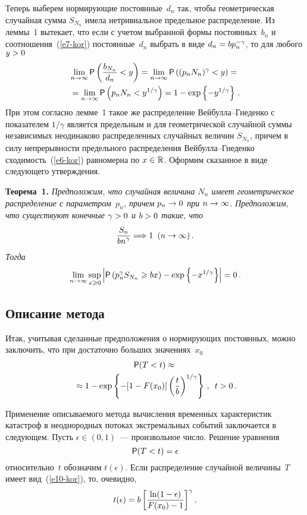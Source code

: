 \begin{multicols}{2}
Теперь выберем нормирующие постоянные~$d_n$ так, чтобы
геометрическая случайная сумма $S_{N_n}$ имела нетривиальное
предельное распределение. Из леммы~1 вытекает, что если с учетом
выбранной формы постоянных~$b_n$ и соотношения~(\ref{e7-kor}) постоянные~$d_n$
выбрать в виде $d_n\hm=bp_n^{-\gamma}$, то для любого $y\hm>0$
\begin{multline*}
\lim\limits_{n\to\infty}{\sf P}\left(\displaystyle\frac{\displaystyle b_{N_n}\mathstrut}{\displaystyle d_n\mathstrut}<y\right)=
\lim\limits_{n\to\infty}{\sf P}\left((p_nN_n)^{\gamma}<y\right)={}\\
{}=
\lim\limits_{n\to\infty}{\sf P}\left(p_nN_n<y^{1/\gamma}\right)=
1-\exp\left\{-y^{1/\gamma}\right\}\,.
\end{multline*}
При этом согласно лемме~1 такое же распределение Вей\-бул\-ла--Гне\-ден\-ко
с показателем $1/\gamma$ является предельным и для геометрической
случайной суммы независимых неодинаково распределенных случайных
величин $S_{N_n}$, причем в силу непрерывности предельного
распределения Вей\-бул\-ла--Гне\-ден\-ко сходимость~(\ref{e6-kor}) равномерна по
$x\hm\in\r$. Оформим сказанное в виде следующего утверждения.

\smallskip

\noindent
\textbf{Теорема~1.} \textit{Предположим, что случайная величина $N_n$
имеет геометрическое распределение с па\-ра\-мет\-ром~$p_n$, причем
$p_n\hm\to0$ при $n\hm\to\infty$. Предположим, что существуют конечные
$\gamma\hm>0$ и $b\hm>0$ такие, что
$$
\displaystyle\frac{\displaystyle S_n\mathstrut}{\displaystyle bn^{\gamma}\mathstrut}\Longrightarrow 1\enskip (n\to\infty)\,.
$$
Тогда}
$$
\lim\limits_{n\to\infty}\sup\limits_{x\geqslant0}\left\vert{\sf  P}
\left(p_n^{\gamma}S_{N_n}\geqslant 
bx\right)-\exp\left\{-x^{1/\gamma}\right\}\right\vert=0\,.
$$


\subsection{Описание метода}

Итак, учитывая сделанные предположения о нормирующих постоянных,
можно заключить, что при достаточно больших значениях~$x_0$
\begin{multline} 
{\sf P}(T<t)\approx{}\\
{}\approx
1-\exp\left\{-[1-F(x_0)]\left(\displaystyle\frac{\displaystyle t\mathstrut}{\displaystyle b\mathstrut}\right)^{1/\gamma}\right\}\,,\enskip
t>0\,.\label{e10-kor}
\end{multline}

Применение описываемого метода вычисления временн$\acute{\mbox{ы}}$х
характеристик катастроф в неоднородных потоках экстремальных событий
заключается в следующем. Пусть $\epsilon\in(0,1)$~--- произвольное
число. Решение уравнения 
$$
{\sf P}(T<t)=\epsilon
$$ относительно~$t$ обозначим $t(\epsilon)$. Если распределение случайной величины~$T$
имеет вид~(\ref{e10-kor}), то, очевидно,
$$
t(\epsilon)=b\left[\displaystyle\frac{\displaystyle \ln(1-\epsilon)\mathstrut}{\displaystyle F(x_0)-1\mathstrut}\right]^{\gamma}.
$$


\end{multicols}
